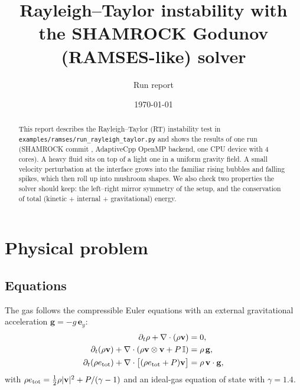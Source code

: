 \documentclass[11pt,a4paper]{article}
\title{Rayleigh--Taylor instability with the SHAMROCK Godunov (RAMSES-like) solver}
\author{Run report}
\date{\today}
\begin{document}
\maketitle

\begin{abstract}
This report describes the Rayleigh--Taylor (RT) instability test in
\texttt{examples/ramses/run\_rayleigh\_taylor.py} and shows the results of one run (SHAMROCK commit
\texttt{\commit}, AdaptiveCpp OpenMP backend, one CPU device with 4 cores). A heavy fluid sits on top of a
light one in a uniform gravity field. A small velocity perturbation at the interface grows into the
familiar rising bubbles and falling spikes, which then roll up into mushroom shapes. We also check
two properties the solver should keep: the left--right mirror symmetry of the setup, and the
conservation of total (kinetic + internal + gravitational) energy.
\end{abstract}

\section{Physical problem}

\subsection{Equations}
The gas follows the compressible Euler equations with an external gravitational acceleration
$\mathbf{g} = -g\,\mathbf{e}_y$:
\begin{align}
\partial_t \rho + \nabla\cdot(\rho\mathbf{v}) &= 0,\\
\partial_t (\rho\mathbf{v}) + \nabla\cdot(\rho\mathbf{v}\otimes\mathbf{v} + P\,\mathbb{I}) &= \rho\,\mathbf{g},\\
\partial_t (\rho e_{\rm tot}) + \nabla\cdot\big[(\rho e_{\rm tot} + P)\mathbf{v}\big] &= \rho\,\mathbf{v}\cdot\mathbf{g},
\end{align}
with $\rho e_{\rm tot} = \tfrac12\rho|\mathbf{v}|^2 + P/(\gamma-1)$ and an ideal-gas equation of
state with $\gamma = 1.4$.
\end{document}
